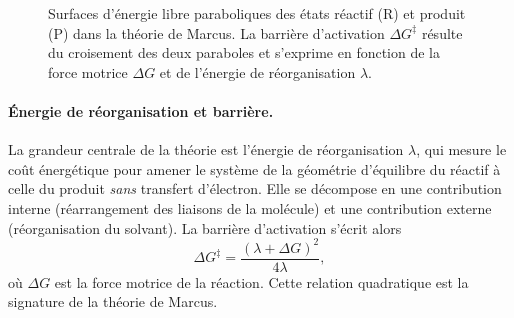 \begin{figure}[htbp]
\centering
{}
\caption{Surfaces d'énergie libre paraboliques des états réactif (R) et
produit (P) dans la théorie de Marcus. La barrière d'activation
$\Delta G^\ddagger$ résulte du croisement des deux paraboles et s'exprime en
fonction de la force motrice $\Delta G$ et de l'énergie de réorganisation
$\lambda$.}
\label{fig:marcus_parabole}
\end{figure}

\paragraph{Énergie de réorganisation et barrière.}
La grandeur centrale de la théorie est l'énergie de réorganisation $\lambda$,
qui mesure le coût énergétique pour amener le système de la géométrie
d'équilibre du réactif à celle du produit \emph{sans} transfert d'électron.
Elle se décompose en une contribution interne (réarrangement des liaisons de
la molécule) et une contribution externe (réorganisation du solvant). La
barrière d'activation s'écrit alors
\begin{equation}
\Delta G^\ddagger = \frac{(\lambda + \Delta G)^2}{4\lambda},
\label{eq:marcus_barriere}
\end{equation}
où $\Delta G$ est la force motrice de la réaction. Cette relation quadratique
est la signature de la théorie de Marcus.

